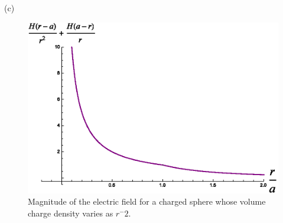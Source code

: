 \begin{homeworkProblem}
\begin{homeworkSection}{(c)}
\begin{figure}%
\centerline{\includegraphics[width=.75\columnwidth,height=.25\paperheight]{./Images/nsphereequalsminustwo.eps}}%
\caption{Magnitude of the electric field for a charged sphere whose volume charge density varies as $r^-2$.}%
\label{nisminustwo}%
\end{figure}

\end{homeworkSection}

\end{homeworkProblem}

